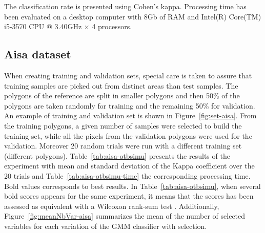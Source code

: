 \documentclass[journal,peerreview,onecolumn]{IEEEtran}
\begin{document}
    The    classification   rate    is    presented   using    Cohen's
    kappa. Processing  time has been  evaluated on a  desktop computer
    with  8Gb of  RAM  and  Intel(R) Core(TM)  i5-3570  CPU @  3.40GHz
    $\times$ 4 processors.

    \subsection{Aisa dataset}
    \label{sec:aisa}

    When creating training and validation  sets, special care is taken
    to assure that training samples are picked out from distinct areas
    than test  samples.  The  polygons of the  reference are  split in
    smaller polygons and then 50\%  of the polygons are taken randomly
    for training and the remaining 50\% for validation.  An example of
    training      and     validation      set     is      shown     in
    Figure~\ref{fig:set-aisa}.  From the  training  polygons, a  given
    number of samples  were selected to build the  training set, while
    all  the pixels  from the  validation polygons  were used  for the
    validation.  Moreover 20  random trials were run  with a different
    training  set (different  polygons).  Table~\ref{tab:aisa-otbsimu}
    presents  the results  of the  experiment with  mean and  standard
    deviation  of  the  Kappa  coefficient  over  the  20  trials  and
    Table~\ref{tab:aisa-otbsimu-time}  the   corresponding  processing
    time. Bold values corresponds to best results. In Table~\ref{tab:aisa-otbsimu}, when several bold scores appears for the same experiment, it means that the scores has been assessed as equivalent with a Wilcoxon rank-sum test \cite{mann1947test}. Additionally, Figure~\ref{fig:meanNbVar-aisa} summarizes the mean of the number of selected variables for each variation of the GMM classifier with selection.
\end{document}
